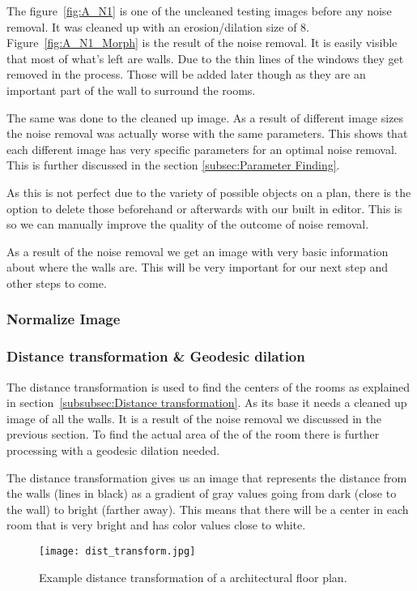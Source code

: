 The figure~\ref{fig:A_N1} is one of the uncleaned testing images before any noise removal. It was cleaned up with an erosion/dilation size of 8. Figure~\ref{fig:A_N1_Morph} is the result of the noise removal. It is easily visible that most of what's left are walls. Due to the thin lines of the windows they get removed in the process. Those will be added later though as they are an important part of the wall to surround the rooms.

The same was done to the cleaned up image. As a result of different image sizes the noise removal was actually worse with the same parameters. This shows that each different image has very specific parameters for an optimal noise removal. This is further discussed in the section \ref{subsec:Parameter Finding}.

As this is not perfect due to the variety of possible objects on a plan, there is the option to delete those beforehand or afterwards with our built in editor. This is so we can manually improve the quality of the outcome of noise removal.

As a result of the noise removal we get an image with very basic information about where the walls are. This will be very important for our next step and other steps to come.
\subsubsection{Normalize Image}
\subsubsection{Distance transformation \& Geodesic dilation}
The distance transformation is used to find the centers of the rooms as explained in section~\ref{subsubsec:Distance transformation}. As its base it needs a cleaned up image of all the walls. It is a result of the noise removal we discussed in the previous section. To find the actual area of the of the room there is further processing with a geodesic dilation needed.

The distance transformation gives us an image that represents the distance from the walls (lines in black) as a gradient of gray values going from dark (close to the wall) to bright (farther away). This means that there will be a center in each room that is very bright and has color values close to white.

\begin{figure}[H]
	\centering
	\texttt{[image: dist\_transform.jpg]}
	\caption{Example distance transformation of a architectural floor plan.}
	\label{fig:dist_transform}
\end{figure}

